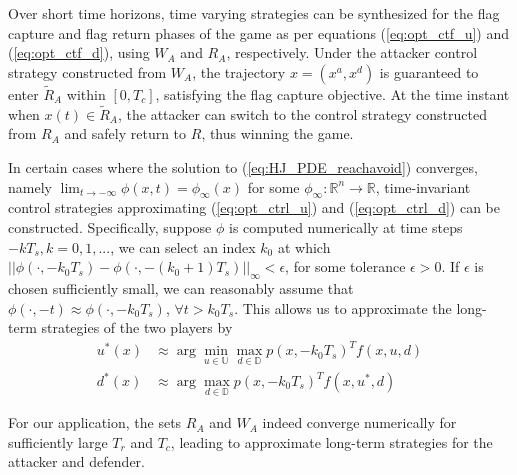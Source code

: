 \documentclass[letterpaper, 10 pt, conference]{ieeeconf}  %
\numberwithin{algorithm}{section}
\begin{document}

Over short time horizons, time varying strategies can be synthesized for the flag capture and flag return phases of the game as per equations (\ref{eq:opt_ctf_u}) and (\ref{eq:opt_ctf_d}), using $W_A$ and $R_A$, respectively. Under the attacker control strategy constructed from $W_A$, the trajectory $x = (x^a, x^d)$ is guaranteed to enter $\tilde{R}_A$ within $[0,T_c]$, satisfying the flag capture objective. At the time instant when $x(t) \in \tilde{R}_A$, the attacker can switch to the control strategy constructed from $R_A$ and safely return to $R$, thus winning the game.

In certain cases where the solution to (\ref{eq:HJ_PDE_reachavoid}) converges, namely $\lim_{t \rightarrow -\infty} \phi(x,t) = \phi_\infty(x)$ for some $\phi_\infty: \mathbb{R}^n \rightarrow \mathbb{R}$, time-invariant control strategies approximating (\ref{eq:opt_ctrl_u}) and (\ref{eq:opt_ctrl_d}) can be constructed. Specifically, suppose $\phi$ is computed numerically at time steps $-kT_s, k = 0,1,...$, we can select an index $k_0$ at which $||\phi(\cdot, -k_0 T_s) - \phi(\cdot, -(k_0+1)T_s)||_\infty < \epsilon$, for some tolerance $\epsilon > 0$. If $\epsilon$ is chosen sufficiently small, we can reasonably assume that $\phi(\cdot, -t) \approx \phi(\cdot, -k_0 T_s)$, $\forall t > k_0 T_s$. This allows us to approximate the long-term strategies of the two players by
\begin{align}
	\label{eq:opt_ctrl_inf_u}
  u^*(x) &\approx \arg \min_{u \in \mathbb{U}} \max_{d \in \mathbb{D}} p(x,-k_0 T_s)^T f(x,u,d) \\
  \label{eq:opt_ctrl_inf_d}
  d^*(x) &\approx \arg \max_{d \in \mathbb{D}} p(x,-k_0 T_s)^T f(x,u^*,d) 
\end{align}

For our application, the sets $R_A$ and $W_A$ indeed converge numerically for sufficiently large $T_r$ and $T_c$, leading to approximate long-term strategies for the attacker and defender.
\end{document}
